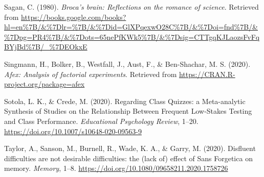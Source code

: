 \documentclass[
  english,
  man]{apa6}
\begin{document}
\leavevmode\hypertarget{ref-Sagan1980}{}%
Sagan, C. (1980). \emph{Broca's brain: Reflections on the romance of science}. Retrieved from \url{https://books.google.com/books?hl=en\%7B/\&\%7Dlr=\%7B/\&\%7Did=GlXPqexwO28C\%7B/\&\%7Doi=fnd\%7B/\&\%7Dpg=PR4\%7B/\&\%7Dots=65nePfKWk5\%7B/\&\%7Dsig=CTTgqKJLaozsFvFqBYjBd\%7B/_\%7DEOkxE}

\leavevmode\hypertarget{ref-Singmann2020}{}%
Singmann, H., Bolker, B., Westfall, J., Aust, F., \& Ben-Shachar, M. S. (2020). \emph{Afex: Analysis of factorial experiments}. Retrieved from \url{https://CRAN.R-project.org/package=afex}

\leavevmode\hypertarget{ref-Sotola2020}{}%
Sotola, L. K., \& Crede, M. (2020). Regarding Class Quizzes: a Meta-analytic Synthesis of Studies on the Relationship Between Frequent Low-Stakes Testing and Class Performance. \emph{Educational Psychology Review}, 1--20. \url{https://doi.org/10.1007/s10648-020-09563-9}

\leavevmode\hypertarget{ref-Taylor2020}{}%
Taylor, A., Sanson, M., Burnell, R., Wade, K. A., \& Garry, M. (2020). Disfluent difficulties are not desirable difficulties: the (lack of) effect of Sans Forgetica on memory. \emph{Memory}, 1--8. \url{https://doi.org/10.1080/09658211.2020.1758726}

\endgroup
\end{document}
